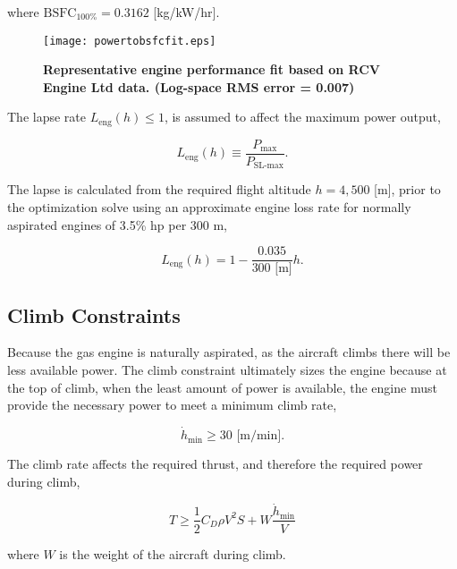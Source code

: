 where $\text{BSFC}_{100\%} = 0.3162$ [kg/kW/hr].\cite{rcvengines}

\begin{figure}[h!]
	\begin{center}
	\texttt{[image: powertobsfcfit.eps]}
    \caption{\textbf{Representative engine performance fit based on RCV Engine Ltd data.  (Log-space RMS error = 0.007) }}
	\label{f:powertobsfc}
	\end{center}
\end{figure}

The lapse rate $L_{\text{eng}}(h) \leq 1$, is assumed to affect the maximum power output,

\begin{equation}
    \label{e:lapse}
    L_{\text{eng}}(h) \equiv \frac{P_{\text{max}}}{P_{\text{SL-max}}}.
\end{equation}

The lapse is calculated from the required flight altitude $h=4,500$ [m], prior to the optimization solve using an approximate engine loss rate for normally aspirated engines of 3.5\% hp per 300 m,\cite{enginelapse}

\begin{equation}
    \label{e:lapsefit}
    L_{\text{eng}}(h) = 1 - \frac{0.035}{300 \text{ [m]}} h.
\end{equation}

\subsection{Climb Constraints}

Because the gas engine is naturally aspirated, as the aircraft climbs there will be less available power.  
The climb constraint ultimately sizes the engine because at the top of climb, when the least amount of power is available, the engine must provide the necessary power to meet a minimum climb rate, 

\begin{equation}
    \label{e:climbrate}
    \dot{h}_{\text{min}} \geq 30 \text{ [m/min]}.
\end{equation}

The climb rate affects the required thrust, and therefore the required power during climb, 

\begin{equation}
    \label{e:climb}
    T \geq \frac{1}{2} C_D \rho V^2 S + W \frac{\dot{h}_{\text{min}}}{V}
\end{equation}

where $W$ is the weight of the aircraft during climb.  
